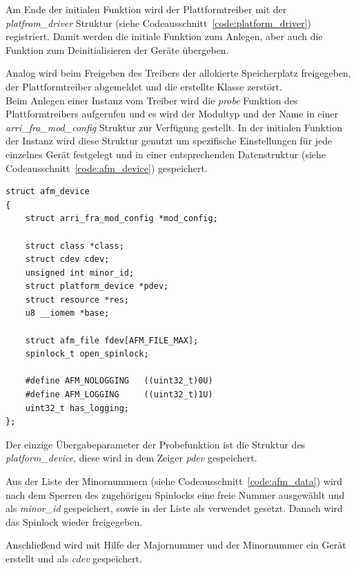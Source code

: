 Am Ende der initialen Funktion wird der Plattformtreiber mit der \textit{platfrom\_driver} Struktur (siehe Codeausschnitt~\ref{code:platform_driver}) registriert. Damit werden die initiale Funktion zum Anlegen, aber auch die Funktion zum Deinitialisieren der Geräte übergeben.


Analog wird beim Freigeben des Treibers der allokierte Speicherplatz freigegeben, der Plattformtreiber abgemeldet und die erstellte Klasse zerstört.\\


Beim Anlegen einer Instanz vom Treiber wird die \textit{probe} Funktion des Plattformtreibers aufgerufen und es wird der Modultyp und der Name in einer \textit{arri\_fra\_mod\_config} Struktur zur Verfügung gestellt. In der initialen Funktion der Instanz wird diese Struktur genutzt um spezifische Einstellungen für jede einzelnes Gerät festgelegt und in einer entsprechenden Datenstruktur (siehe Codeausschnitt~\ref{code:afm_device}) gespeichert. 

\begin{lstfloat}
\begin{lstlisting}
struct afm_device 
{
	struct arri_fra_mod_config *mod_config;
	
	struct class *class;
	struct cdev cdev;
	unsigned int minor_id;
	struct platform_device *pdev;
	struct resource *res;
	u8 __iomem *base;
	
	struct afm_file fdev[AFM_FILE_MAX];
	spinlock_t open_spinlock;
	
	#define AFM_NOLOGGING   ((uint32_t)0U)
	#define AFM_LOGGING     ((uint32_t)1U)
	uint32_t has_logging;
};
\end{lstlisting}
\end{lstfloat}

Der einzige Übergabeparameter der Probefunktion ist die Struktur des \textit{platform\_device}, diese wird in dem Zeiger \textit{pdev} gespeichert. 

Aus der Liste der Minornummern (siehe Codeausschnitt~\ref{code:afm_data}) wird nach dem Sperren des zugehörigen Spinlocks eine freie Nummer ausgewählt und als \textit{minor\_id} gespeichert, sowie in der Liste als verwendet gesetzt. Danach wird das Spinlock wieder freigegeben.

Anschließend wird mit Hilfe der Majornummer und der Minornummer ein Gerät erstellt und als \textit{cdev} gespeichert. 

